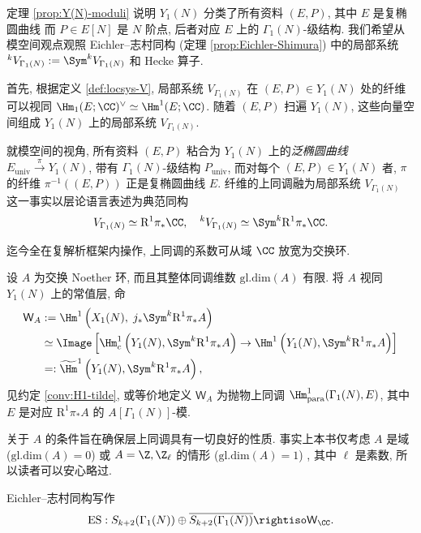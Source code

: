 定理 \ref{prop:Y(N)-moduli} 说明 $Y_1(N)$ 分类了所有资料 $(E, P)$, 其中 $E$ 是复椭圆曲线 而 $P \in E[N]$ 是 $N$ 阶点, 后者对应 $E$ 上的 $\Gamma_1(N)$-级结构. 我们希望从模空间观点观照 Eichler--志村同构 (定理 \ref{prop:Eichler-Shimura}) 中的局部系统 ${}^k V_{\Gamma_1(N)} := \Sym^k V_{\Gamma_1(N)}$ 和 Hecke 算子.

首先, 根据定义 \ref{def:locsys-V}, 局部系统 $V_{\Gamma_1(N)}$ 在 $(E, P) \in Y_1(N)$ 处的纤维可以视同 $\Hm_1(E; \CC)^\vee \simeq \Hm^1(E; \CC)$. 随着 $(E, P)$ 扫遍 $Y_1(N)$, 这些向量空间组成 $Y_1(N)$ 上的局部系统 $V_{\Gamma_1(N)}$.

就模空间的视角, 所有资料 $(E, P)$ 粘合为 $Y_1(N)$ 上的\emph{泛椭圆曲线} $E_{\mathrm{univ}} \xrightarrow{\pi} Y_1(N)$, 带有 $\Gamma_1(N)$-级结构 $P_{\mathrm{univ}}$, 而对每个 $(E, P) \in Y_1(N)$ 者, $\pi$ 的纤维 $\pi^{-1}\left((E, P)\right)$ 正是复椭圆曲线 $E$. 纤维的上同调融为局部系统 $V_{\Gamma_1(N)}$ 这一事实以层论语言表述为典范同构
\[ V_{\Gamma_1(N)} \simeq \mathrm{R}^1 \pi_*  \CC, \quad {}^k V_{\Gamma_1(N)} \simeq \Sym^k \mathrm{R}^1 \pi_* \CC. \]

迄今全在复解析框架内操作, 上同调的系数可从域 $\CC$ 放宽为交换环.

\begin{definition}\label{def:cohomology-WA} 
	设 $A$ 为交换 Noether 环, 而且其整体同调维数 $\mathrm{gl.dim}(A)$ 有限. 将 $A$ 视同 $Y_1(N)$ 上的常值层, 命
	\begin{align*}
		\mathsf{W}_A & := \Hm^1\left( X_1(N), \; j_* \Sym^k \mathrm{R}^1 \pi_* A \right) \\
		& \simeq \Image\left[ \Hm^1_c\left( Y_1(N), \Sym^k \mathrm{R}^1 \pi_* A\right) \to \Hm^1\left( Y_1(N), \Sym^k \mathrm{R}^1 \pi_* A\right) \right] \\
		& =: \widetilde{\Hm}^1\left( Y_1(N), \Sym^k \mathrm{R}^1 \pi_* A \right),
	\end{align*}
	见约定 \ref{conv:H1-tilde}, 或等价地定义 $\mathsf{W}_A$ 为抛物上同调 $\Hm^1_{\mathrm{para}}(\Gamma_1(N), E)$, 其中 $E$ 是对应 $\mathrm{R}^1 \pi_* A$ 的 $A[\Gamma_1(N)]$-模.
\end{definition}

关于 $A$ 的条件旨在确保层上同调具有一切良好的性质. 事实上本书仅考虑 $A$ 是域 ($\mathrm{gl.dim}(A) = 0$) 或 $A = \Z, \Z_\ell$ 的情形 ($\mathrm{gl.dim}(A) = 1$) , 其中 $\ell$ 是素数, 所以读者可以安心略过.

Eichler--志村同构写作
\[ \text{ES}: S_{k+2}(\Gamma_1(N)) \oplus \overline{S_{k+2}(\Gamma_1(N))} \rightiso \mathsf{W}_{\CC}. \]


